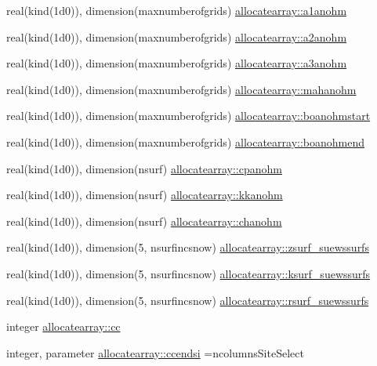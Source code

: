 \begin{DoxyCompactItemize}
\item 
real(kind(1d0)), dimension(maxnumberofgrids) \hyperlink{namespaceallocatearray_a9f0b71fb7110ca245554e33daaead7b9}{allocatearray\+::a1anohm}
\item 
real(kind(1d0)), dimension(maxnumberofgrids) \hyperlink{namespaceallocatearray_a4e8efd0e638a21f7639966960c6464cd}{allocatearray\+::a2anohm}
\item 
real(kind(1d0)), dimension(maxnumberofgrids) \hyperlink{namespaceallocatearray_ae979608ee97f9eb1ab20cfd2bef838db}{allocatearray\+::a3anohm}
\item 
real(kind(1d0)), dimension(maxnumberofgrids) \hyperlink{namespaceallocatearray_afab50b58dfb4bad7d0078ba26cfabb41}{allocatearray\+::mahanohm}
\item 
real(kind(1d0)), dimension(maxnumberofgrids) \hyperlink{namespaceallocatearray_a2f2000b6fe2d48ee6df98331bd186501}{allocatearray\+::boanohmstart}
\item 
real(kind(1d0)), dimension(maxnumberofgrids) \hyperlink{namespaceallocatearray_a69fef98bd89eb5bb96f19caf0e300cb2}{allocatearray\+::boanohmend}
\item 
real(kind(1d0)), dimension(nsurf) \hyperlink{namespaceallocatearray_a24bcde513a65db1cd23573a243901f6a}{allocatearray\+::cpanohm}
\item 
real(kind(1d0)), dimension(nsurf) \hyperlink{namespaceallocatearray_a8055e207eb40afdc658bde6493ab319e}{allocatearray\+::kkanohm}
\item 
real(kind(1d0)), dimension(nsurf) \hyperlink{namespaceallocatearray_a10d39115371a0bd3c9a9fc9d4bc7fb2f}{allocatearray\+::chanohm}
\item 
real(kind(1d0)), dimension(5, nsurfincsnow) \hyperlink{namespaceallocatearray_a082c4e8a9d0c63a3a4cef12491a00e0f}{allocatearray\+::zsurf\+\_\+suewssurfs}
\item 
real(kind(1d0)), dimension(5, nsurfincsnow) \hyperlink{namespaceallocatearray_ab18052a7670fb2dcb20cee408efee503}{allocatearray\+::ksurf\+\_\+suewssurfs}
\item 
real(kind(1d0)), dimension(5, nsurfincsnow) \hyperlink{namespaceallocatearray_a9e55bcf0c5382bbe3fc4267c8f6869f3}{allocatearray\+::rsurf\+\_\+suewssurfs}
\item 
integer \hyperlink{namespaceallocatearray_ac863c81704eb507dee10f5e10741e10c}{allocatearray\+::cc}
\item 
integer, parameter \hyperlink{namespaceallocatearray_a5f0294ee2fa3b1d82be15cd51d1673f9}{allocatearray\+::ccendsi} =ncolumns\+Site\+Select
\item 

\end{DoxyCompactItemize}
